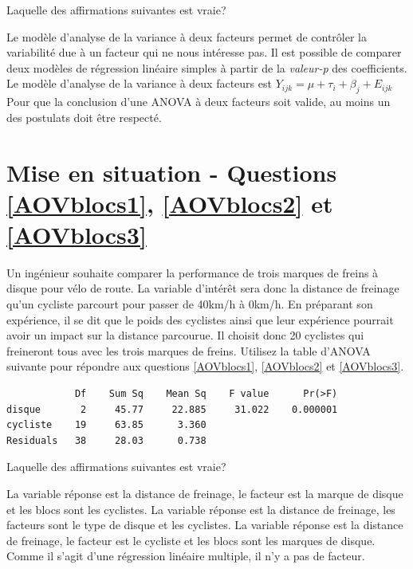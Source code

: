 \begin{questions}
\vspace{1cm}
\question[3] Laquelle des affirmations suivantes est vraie?
\begin{checkboxes}
\choice Le modèle d'analyse de la variance à deux facteurs permet de contrôler la variabilité due à un facteur qui ne nous intéresse pas.
\choice Il est possible de comparer deux modèles de régression linéaire simples à partir de la \textit{valeur-p} des coefficients.
\correctchoice Le modèle d'analyse de la variance à deux facteurs est $Y_{ijk}=\mu+\tau_{i}+\beta_{j}+E_{ijk}$
\choice Pour que la conclusion d'une ANOVA à deux facteurs soit valide, au moins un des postulats doit être respecté.
\end{checkboxes}


\newpage
\section*{Mise en situation - Questions \ref{AOVblocs1}, \ref{AOVblocs2} et \ref{AOVblocs3}}
Un ingénieur souhaite comparer la performance de trois marques de freins à disque pour vélo de route. La variable d'intérêt sera donc la distance de freinage qu'un cycliste parcourt pour passer de 40km/h à 0km/h. En préparant son expérience, il se dit que le poids des cyclistes ainsi que leur expérience pourrait avoir un impact sur la distance parcourue. Il choisit donc 20 cyclistes qui freineront tous avec les trois marques de freins. Utilisez la table d'ANOVA suivante pour répondre aux questions \ref{AOVblocs1}, \ref{AOVblocs2} et \ref{AOVblocs3}.
\begin{verbatim}
            Df    Sum Sq    Mean Sq    F value      Pr(>F)    
disque       2     45.77     22.885     31.022    0.000001
cycliste    19     63.85      3.360    
Residuals   38     28.03      0.738      
\end{verbatim}

\question[3]\label{AOVblocs1} Laquelle des affirmations suivantes est vraie?

\begin{checkboxes}
    \correctchoice La variable réponse est la distance de freinage, le facteur est la marque de disque et les blocs sont les cyclistes.
\choice La variable réponse est la distance de freinage, les facteurs sont le type de disque et les cyclistes.
\choice La variable réponse est la distance de freinage, le facteur est le cycliste et les blocs sont les marques de disque.
\choice Comme il s'agit d'une régression linéaire multiple, il n'y a pas de facteur.
\end{checkboxes}


\end{questions}
